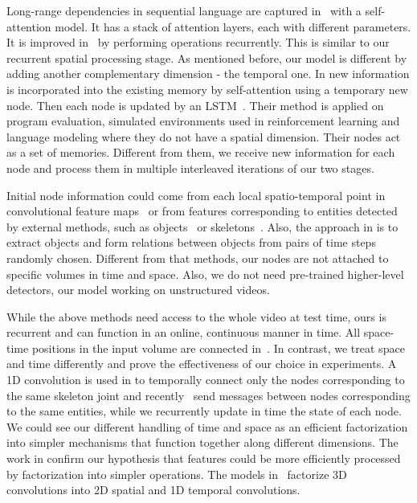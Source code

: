 \documentclass{article}
\begin{document}
Long-range dependencies in sequential language are captured in~\cite{vaswani2017attention} with a self-attention model. It has a stack of attention layers, each with different parameters. It is improved in~\cite{dehghani2018universal_transformer} by performing operations recurrently. This is similar to our recurrent spatial processing stage. As mentioned before, our model is different by adding another complementary dimension - the temporal one.
In \cite{NIPS2018_7960_transformer} new information is incorporated into the existing memory by self-attention using a temporary new node. Then each node is updated by an LSTM~\cite{hochreiter1997long_lstm}. Their method is applied on program evaluation, simulated environments used in reinforcement learning and language modeling where they do not have a spatial dimension. Their nodes act as a set of memories. Different from them, we receive new information for each node and process them in multiple interleaved iterations of our two stages.

Initial node information could come from each local spatio-temporal point in convolutional feature maps~\cite{NIPS2017_7082_ralational_cuburi, wang2018non_local} or from features corresponding to entities detected by external methods, such as objects~\cite{wang2018videos_gupta2, Ghosh2018StackedSG_B, tsai2019video_C} or skeletons~\cite{yan2018spatial_A}. Also, the approach in \cite{Baradel_2018_ECCV_orn} is to extract objects and form relations between objects from pairs of time steps randomly chosen. Different from that methods, our nodes are not attached to specific volumes in time and space. Also, we do not need pre-trained higher-level detectors, our model working on unstructured videos.

 While the above methods need access to the whole video at test time, ours is recurrent and can function in an online, continuous manner in time. 
 All space-time positions in the input volume are connected in~\cite{wang2018non_local, wang2018videos_gupta2,chen20182_a2nets}. In contrast, we treat space and time differently and prove the effectiveness of our choice in experiments.  
 A 1D convolution is used in \cite{yan2018spatial_A} to temporally connect only the nodes corresponding to the same skeleton joint and recently~\cite{Ghosh2018StackedSG_B} send messages between nodes corresponding to the same entities, while we recurrently update in time the state of each node. We could see our different handling of time and space as an efficient factorization into simpler mechanisms that function together along different dimensions. The work in \cite{szegedy2016incv2, chollet2017xception} confirm our hypothesis that features could be more efficiently processed by factorization into simpler operations. The models in~\cite{sun2015human_factorised, xie2018rethinking, tran2018closer} factorize 3D convolutions into 2D spatial and 1D temporal convolutions.
\end{document}
